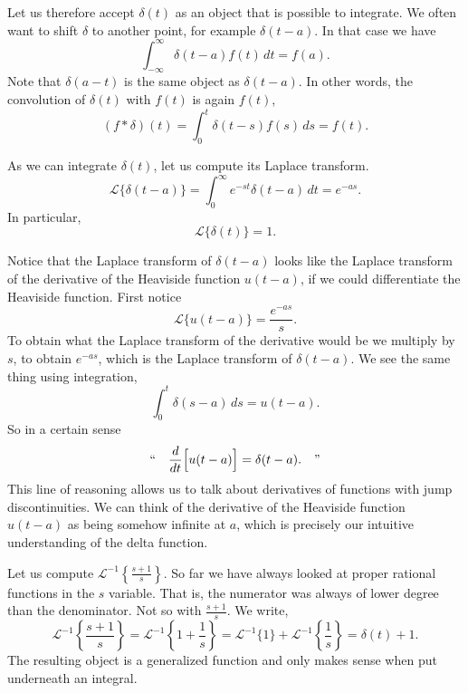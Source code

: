 Let us therefore accept $\delta(t)$ as an object that is possible to
integrate.  We often want to shift $\delta$ to another point, for example
$\delta(t-a)$.  In that case we have
\begin{equation*}
\int_{-\infty}^\infty \delta(t-a) f(t) \,dt = f(a) .
\end{equation*}
Note that $\delta(a-t)$ is the same object as $\delta(t-a)$.
In other words, the convolution of $\delta(t)$ with $f(t)$ is again $f(t)$,
\begin{equation*}
(f * \delta) (t) = 
\int_{0}^t \delta(t-s) f(s) \,ds
= f(t) .
\end{equation*}

As we can integrate $\delta(t)$, let us compute its Laplace transform.
\begin{equation*}
\boxed{~~
{\mathcal{L}} \bigl\{ \delta(t-a) \bigr\}
=
\int_{0}^\infty e^{-st} \delta(t-a) \,dt = e^{-as} .
~~}
\end{equation*}
In particular,
\begin{equation*}
{\mathcal{L}} \bigl\{ \delta(t) \bigr\} = 1 .
\end{equation*}

\begin{remark}
Notice that the Laplace transform of $\delta(t-a)$ looks like
the Laplace transform of the derivative of the Heaviside function
$u(t-a)$, if we could differentiate the Heaviside function.
First notice
\begin{equation*}
{\mathcal{L}} \bigl\{ u(t-a) \bigr\} = \frac{e^{-as}}{s}.
\end{equation*}
To obtain what the Laplace transform of the derivative would be
we multiply by $s$, to obtain $e^{-as}$, which is the Laplace transform
of $\delta(t-a)$.
We see the same thing using integration,
\begin{equation*}
\int_0^t \delta(s-a)\,ds = u(t-a) .
\end{equation*}
So in a certain sense
\begin{equation*}
\text{``} \quad \frac{d}{dt} \Bigl[ u(t-a) \Bigr] = \delta(t-a) . \quad \text{''}
\end{equation*}
This line of reasoning allows us to talk about derivatives of functions with jump
discontinuities.
We can think of
the derivative of the Heaviside function $u(t-a)$ as being somehow infinite
at $a$, which is precisely our intuitive understanding of the delta
function.
\end{remark}

\begin{example}
Let us compute ${\mathcal{L}}^{-1} \left\{ \frac{s+1}{s} \right\}$.  So
far we have always looked at proper rational functions in the $s$ variable.
That is, the numerator was always of lower degree than the denominator.
Not so with $\frac{s+1}{s}$.
We write,
\begin{equation*}
{\mathcal{L}}^{-1} \left\{ \frac{s+1}{s} \right\}
=
{\mathcal{L}}^{-1} \left\{ 1 + \frac{1}{s} \right\}
=
{\mathcal{L}}^{-1} \{ 1 \}
+
{\mathcal{L}}^{-1} \left\{ \frac{1}{s} \right\}
=
\delta(t) + 1 .
\end{equation*}
The resulting object is a generalized
function and only makes sense when put underneath an integral.
\end{example}

